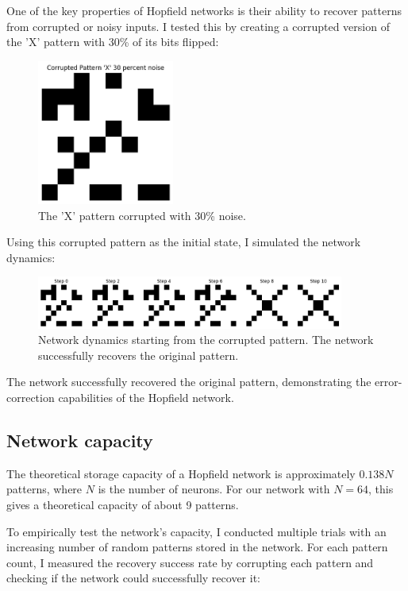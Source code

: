 \documentclass{article}
\begin{document}
One of the key properties of Hopfield networks is their ability to recover patterns from corrupted or noisy inputs. I tested this by creating a corrupted version of the 'X' pattern with 30\% of its bits flipped:

\begin{figure}[H]
\centering
\includegraphics[width=0.4\textwidth]{Corrupted Pattern 'X' 30 percent noise.png}
\caption{The 'X' pattern corrupted with 30\% noise.}
\label{fig:corrupted}
\end{figure}

Using this corrupted pattern as the initial state, I simulated the network dynamics:

\begin{figure}[H]
\centering
\includegraphics[width=0.9\textwidth]{Network Activity Corrupted X.png}
\caption{Network dynamics starting from the corrupted pattern. The network successfully recovers the original pattern.}
\label{fig:recovery}
\end{figure}

The network successfully recovered the original pattern, demonstrating the error-correction capabilities of the Hopfield network.


\subsection{Network capacity}

The theoretical storage capacity of a Hopfield network is approximately $0.138N$ patterns, where $N$ is the number of neurons. For our network with $N=64$, this gives a theoretical capacity of about 9 patterns.

To empirically test the network's capacity, I conducted multiple trials with an increasing number of random patterns stored in the network. For each pattern count, I measured the recovery success rate by corrupting each pattern and checking if the network could successfully recover it:
\end{document}
